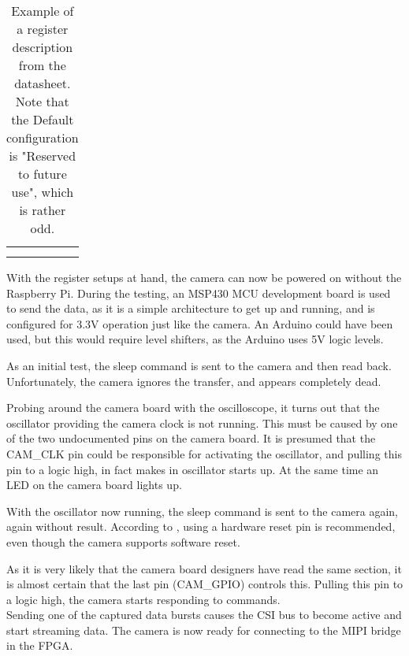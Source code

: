 \begin{table}[H]
{\begin{tabular}{|c|l|c|c|}
                          &                                                                                                                                                                                                                                                                          &                       &                          \\
                          &                                                                                                                                                                                                                                                                          &                       &                          \\ \hline
\end{tabular}
}
\caption{Example of a register description from the datasheet. Note that the Default configuration is "Reserved to future use", which is rather odd.}
\label{idiocrazy}
\end{table}


With the register setups at hand, the camera can now be powered on without the Raspberry Pi. During the testing, an MSP430 MCU development board is used to send the \iic data, as it is a simple architecture to get up and running, and is configured for 3.3V operation just like the camera. An Arduino could have been used, but this would require \iic level shifters, as the Arduino uses 5V logic levels.

As an initial test, the sleep command is sent to the camera and then read back. Unfortunately, the camera ignores the \iic transfer, and appears completely dead.

Probing around the camera board with the oscilloscope, it turns out that the oscillator providing the camera clock is not running. This must be caused by one of the two undocumented pins on the camera board. It is presumed that the CAM\_CLK pin could be responsible for activating the oscillator, and pulling this pin to a logic high, in fact makes in oscillator starts up. At the same time an LED on the camera board lights up.

With the oscillator now running, the sleep command is sent to the camera again, again without result.
According to \citep[p. 23: reset]{picam_datasheet}, using a hardware reset pin is recommended, even though the camera supports software reset.

As it is very likely that the camera board designers have read the same section, it is almost certain that the last pin (CAM\_GPIO) controls this.
Pulling this pin to a logic high, the camera starts responding to \iic commands.\\
Sending one of the captured data bursts causes the CSI bus to become active and start streaming data. The camera is now ready for connecting to the MIPI bridge in the FPGA.
